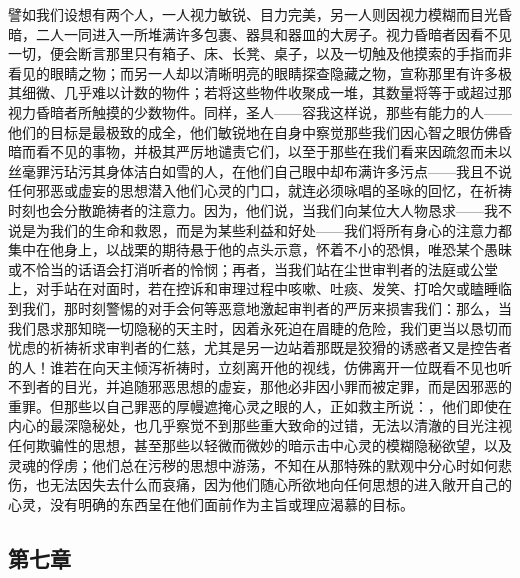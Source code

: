 譬如我们设想有两个人，一人视力敏锐、目力完美，另一人则因视力模糊而目光昏暗，二人一同进入一所堆满许多包裹、器具和器皿的大房子。视力昏暗者因看不见一切，便会断言那里只有箱子、床、长凳、桌子，以及一切触及他摸索的手指而非看见的眼睛之物；而另一人却以清晰明亮的眼睛探查隐藏之物，宣称那里有许多极其细微、几乎难以计数的物件；若将这些物件收聚成一堆，其数量将等于或超过那视力昏暗者所触摸的少数物件。同样，圣人——容我这样说，那些有能力的人——他们的目标是最极致的成全，他们敏锐地在自身中察觉那些我们因心智之眼仿佛昏暗而看不见的事物，并极其严厉地谴责它们，以至于那些在我们看来因疏忽而未以丝毫罪污玷污其身体洁白如雪的人，在他们自己眼中却布满许多污点——我且不说任何邪恶或虚妄的思想潜入他们心灵的门口，就连必须咏唱的圣咏的回忆，在祈祷时刻也会分散跪祷者的注意力。因为，他们说，当我们向某位大人物恳求——我不说是为我们的生命和救恩，而是为某些利益和好处——我们将所有身心的注意力都集中在他身上，以战栗的期待悬于他的点头示意，怀着不小的恐惧，唯恐某个愚昧或不恰当的话语会打消听者的怜悯；再者，当我们站在尘世审判者的法庭或公堂上，对手站在对面时，若在控诉和审理过程中咳嗽、吐痰、发笑、打哈欠或瞌睡临到我们，那时刻警惕的对手会何等恶意地激起审判者的严厉来损害我们：那么，当我们恳求那知晓一切隐秘的天主时，因着永死迫在眉睫的危险，我们更当以恳切而忧虑的祈祷祈求审判者的仁慈，尤其是另一边站着那既是狡猾的诱惑者又是控告者的人！谁若在向天主倾泻祈祷时，立刻离开他的视线，仿佛离开一位既看不见也听不到者的目光，并追随邪恶思想的虚妄，那他必非因小罪而被定罪，而是因邪恶的重罪。但那些以自己罪恶的厚幔遮掩心灵之眼的人，正如救主所说：，他们即使在内心的最深隐秘处，也几乎察觉不到那些重大致命的过错，无法以清澈的目光注视任何欺骗性的思想，甚至那些以轻微而微妙的暗示击中心灵的模糊隐秘欲望，以及灵魂的俘虏；他们总在污秽的思想中游荡，不知在从那特殊的默观中分心时如何悲伤，也无法因失去什么而哀痛，因为他们随心所欲地向任何思想的进入敞开自己的心灵，没有明确的东西呈在他们面前作为主旨或理应渴慕的目标。\par


\subsection{第七章}

\par

